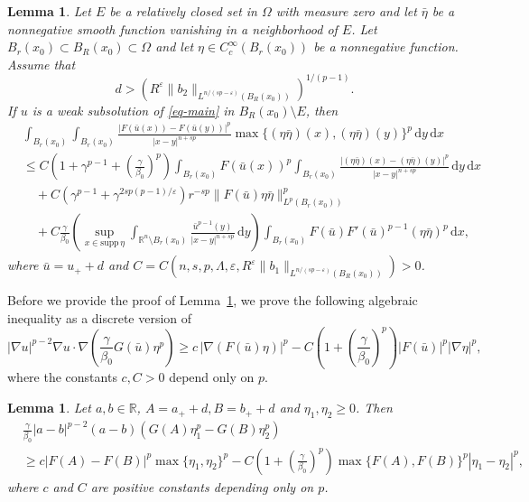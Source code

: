 \documentclass[11pt]{amsart}
\theoremstyle{plain}
\newtheorem{lemma}[theorem]{Lemma}
\theoremstyle{definition}
\numberwithin{equation}{section}
\begin{document}
\begin{lemma}\label{lem-Caccio1}
Let $E$ be a relatively closed set in $\Omega$ with measure zero and let $\bar{\eta}$ be a nonnegative smooth function vanishing in a neighborhood of $E$. Let $B_r(x_0) \subset B_R(x_0)\subset \Omega$ and let $\eta \in C^\infty_c(B_r(x_0))$ be a nonnegative function. Assume that
\begin{equation}\label{eq-d}
d > \left( R^{\varepsilon}\|b_2\|_{L^{n/(sp-\varepsilon)}(B_R(x_0))} \right)^{1/(p-1)}.
\end{equation}
If $u$ is a weak subsolution of \eqref{eq-main} in $B_R(x_0) \setminus E$, then
\begin{equation}\label{eq-Caccio1}
\begin{split}
&\int_{B_r(x_0)} \int_{B_r(x_0)} \frac{|F(\bar{u}(x))-F(\bar{u}(y))|^p}{|x-y|^{n+sp}} \max\{ (\eta\bar{\eta})(x), (\eta\bar{\eta})(y) \}^p \,\mathrm{d}y \,\mathrm{d}x \\
&\leq C \left( 1+\gamma^{p-1}+\left( \frac{\gamma}{\beta_0} \right)^p \right) \int_{B_r(x_0)} F(\bar{u}(x))^p \int_{B_r(x_0)} \frac{|(\eta\bar{\eta})(x)-(\eta\bar{\eta})(y)|^p}{|x-y|^{n+sp}} \,\mathrm{d}y\,\mathrm{d}x \\
&\quad + C \left( \gamma^{p-1} + \gamma^{2sp(p-1)/\varepsilon} \right) r^{-sp} \|F(\bar{u})\eta\bar{\eta}\|_{L^p(B_r(x_0))}^p \\
&\quad + C \frac{\gamma}{\beta_0} \left( \sup_{x \in \mathrm{supp} \, \eta} \int_{\mathbb{R}^n \setminus B_r(x_0)} \frac{\bar{u}^{p-1}(y)}{|x-y|^{n+sp}} \,\mathrm{d}y \right) \int_{B_r(x_0)} F(\bar{u}) F'(\bar{u})^{p-1} (\eta\bar{\eta})^p \,\mathrm{d}x,
\end{split}
\end{equation}
where $\bar{u}=u_++d$ and $C=C(n, s, p, \Lambda, \varepsilon, R^{\varepsilon}\|b_1\|_{L^{n/(sp-\varepsilon)}(B_R(x_0))})>0$.
\end{lemma}

Before we provide the proof of Lemma~\ref{lem-Caccio1}, we prove the following algebraic inequality as a discrete version of
\begin{equation*}
|\nabla u|^{p-2} \nabla u \cdot \nabla \left( \frac{\gamma}{\beta_0}G(\bar{u}) \eta^p \right) \geq c \, |\nabla (F(\bar{u}) \eta)|^p - C \left( 1+\left( \frac{\gamma}{\beta_0} \right)^p \right) |F(\bar{u})|^p |\nabla \eta|^p,
\end{equation*}
where the constants $c, C>0$ depend only on $p$.

\begin{lemma}\label{lem-alg-ineq1}
Let $a, b \in \mathbb{R}$, $A=a_++d, B=b_++d$ and $\eta_1, \eta_2 \geq 0$. Then
\begin{equation*}
\begin{split}
&\frac{\gamma}{\beta_0} |a-b|^{p-2}(a-b) (G(A) \eta_1^p - G(B) \eta_2^p) \\
&\geq c \left| F(A) - F(B) \right|^p \max\{\eta_1, \eta_2\}^p - C \left( 1+ \left( \frac{\gamma}{\beta_0} \right)^p \right) \max \lbrace F(A), F(B) \rbrace^p |\eta_1-\eta_2|^p,
\end{split}
\end{equation*}
where $c$ and $C$ are positive constants depending only on $p$.
\end{lemma}
\end{document}
